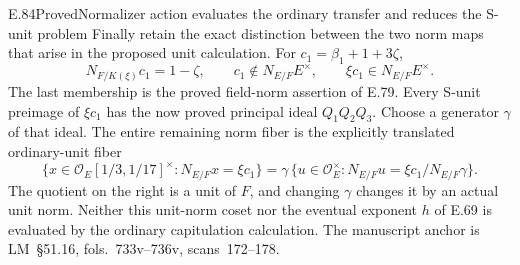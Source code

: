 \begin{statement}{E.84}{Proved}{Normalizer action evaluates the ordinary transfer and reduces the S-unit problem}
Finally retain the exact distinction between the two norm
maps that arise in the proposed unit calculation. For
\(c_1=\beta_1+1+3\zeta\),
\[
 N_{F/K(\xi)}c_1=1-\zeta,\qquad
 c_1\notin N_{E/F}E^\times,\qquad
 \xi c_1\in N_{E/F}E^\times .
 \tag{E84.11}
\]
The last membership is the proved field-norm assertion of
E.79. Every S-unit preimage of \(\xi c_1\) has the now
proved principal ideal \(Q_1Q_2Q_3\). Choose a generator
\(\gamma\) of that ideal. The entire remaining norm fiber is
the explicitly translated ordinary-unit fiber
\[
 \{x\in\mathcal O_E[1/3,1/17]^\times:N_{E/F}x=\xi c_1\}
 =
 \gamma\,
 \{u\in\mathcal O_E^\times:
            N_{E/F}u=\xi c_1/N_{E/F}\gamma\}.
 \tag{E84.12}
\]
The quotient on the right is a unit of \(F\), and changing
\(\gamma\) changes it by an actual unit norm. Neither this
unit-norm coset nor the eventual exponent \(h\) of E.69 is
evaluated by the ordinary capitulation calculation.
The manuscript anchor is LM~\S51.16, fols.~733v--736v,
scans~172--178.
\end{statement}

